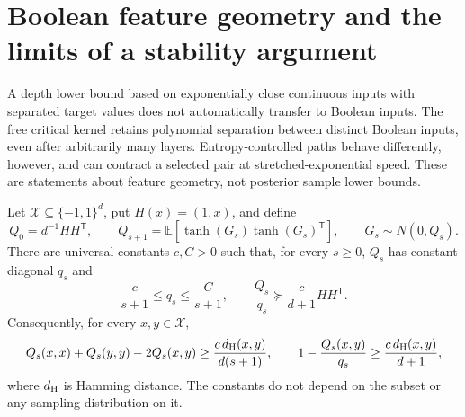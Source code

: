 \section{Boolean feature geometry and the limits of a stability argument}
\label{sec:critical-boolean-kernel-geometry}

A depth lower bound based on exponentially close continuous inputs with
separated target values does not automatically transfer to Boolean inputs. The free critical kernel retains polynomial
separation between distinct Boolean inputs, even after arbitrarily many
layers. Entropy-controlled paths behave differently, however, and can
contract a selected pair at stretched-exponential speed. These are
statements about feature geometry, not posterior sample lower bounds.

\begin{proposition}
\label{prop:critical-free-boolean-geometry}
Let $\mathcal X\subseteq\{-1,1\}^d$, put $H(x)=(1,x)$, and define
\[
 Q_0=d^{-1}HH^{\mathsf T},\qquad
 Q_{s+1}=\mathbb E[\tanh(G_s)\tanh(G_s)^{\mathsf T}],
 \qquad G_s\sim N(0,Q_s).
\]
There are universal constants $c,C>0$ such that, for every $s\ge0$,
$Q_s$ has constant diagonal $q_s$ and
\[
 \frac c{s+1}\le q_s\le\frac C{s+1},\qquad
 \frac{Q_s}{q_s}\succeq\frac c{d+1}HH^{\mathsf T}.
\]
Consequently, for every $x,y\in\mathcal X$,
\[
 Q_s(x,x)+Q_s(y,y)-2Q_s(x,y)
       \ge\frac{c\,d_{\rm H}(x,y)}{d(s+1)},
 \qquad
 1-\frac{Q_s(x,y)}{q_s}
       \ge\frac{c\,d_{\rm H}(x,y)}{d+1},
\]
where $d_{\rm H}$ is Hamming distance. The constants do not depend on
the subset or any sampling distribution on it.
\end{proposition}

